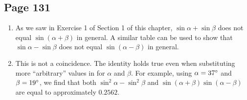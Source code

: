\documentclass{article}
\newenvironment{solutions}[1]
{\subsection*{#1}
 \begin{enumerate}[leftmargin=1.5em]}
{\end{enumerate}}
\newcommand{\solution}{\item}
\newenvironment{subsolutions}
{\begin{enumerate}}
{\end{enumerate}}
\newcommand{\subsolution}{\item}
\begin{document}
\begin{solutions}{Page 131}
\begin{subsolutions}
\subsolution %
If $\alpha$ and $\beta$ are acute angles, then $0 < \alpha + \beta < \pi$. Using the unit circle, we can see that $\sin\left(\alpha+\beta\right)$ must be positive since the angle $\alpha+\beta$ lies in the upper-half of the plane, where the sine function is positive.

\subsolution %
$\sin\left(\alpha+\beta\right) = \sin{\alpha}\cos{\beta} + \cos{\alpha}\sin{\beta}$ is positive when $\alpha$ and $\beta$ are acute angles since the sum and product of positive real numbers is also positive.

$\cos\left(\alpha+\beta\right)$ need not be positive. As shown in part (a) of this exercise, $\cos\left(\alpha+\beta\right)$ can equal 0. Furthermore, $\cos\left(\alpha+\beta\right)$ can be negative. Let $\alpha = \beta = \pi/3$. Then, assuming that we can extend the cosine addition formula to angles $\alpha$ and $\beta$ such that $\alpha + \beta$ is obtuse,
\begin{align*}
\cos\left(\dfrac{\pi}{3} + \dfrac{\pi}{3}\right) &= \cos{\dfrac{\pi}{3}}\cos{\dfrac{\pi}{3}} - \sin{\dfrac{\pi}{3}}\sin{\dfrac{\pi}{3}} \\
&= \dfrac{1}{2} \cdot \dfrac{1}{2} - \dfrac{\sqrt{3}}{2} \cdot \dfrac{\sqrt{3}}{2} \\
&= \dfrac{1}{4} - \dfrac{3}{4} \\
&= -\dfrac{1}{2}
\end{align*}
\end{subsolutions}

\solution %
As we saw in Exercise 1 of Section 1 of this chapter, $\sin{\alpha} + \sin{\beta}$ does not equal $\sin\left(\alpha+\beta\right)$ in general. A similar table can be used to show that $\sin{\alpha} - \sin{\beta}$ does not equal $\sin\left(\alpha-\beta\right)$ in general.

\solution %
This is not a coincidence. The identity holds true even when substituting more ``arbitrary'' values in for $\alpha$ and $\beta$. For example, using $\alpha=37\degree$ and $\beta=19\degree$, we find that both $\sin^{2}{\alpha} - \sin^{2}{\beta}$ and $\sin\left(\alpha+\beta\right)\sin\left(\alpha-\beta\right)$ are equal to approximately $0.2562$.


\end{solutions}
\end{document}
